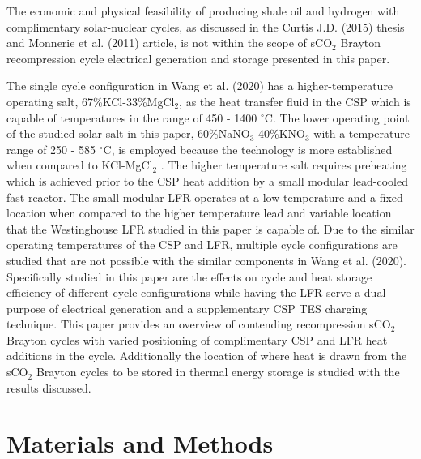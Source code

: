 The economic and physical feasibility of producing shale oil and hydrogen with complimentary solar-nuclear cycles, as discussed in the Curtis J.D. (2015) thesis and Monnerie et al. (2011) article, is not within the scope of sCO$_2$ Brayton recompression cycle electrical generation and storage presented in this paper.

The single cycle configuration in Wang et al. (2020) has a higher-temperature operating salt, 67\%KCl-33\%MgCl$_2$, as the heat transfer fluid in the CSP which is capable of temperatures in the range of 450 - 1400 $^{\circ}$C. The lower operating point of the studied solar salt in this paper, 60\%NaNO$_3$-40\%KNO$_3$ with a temperature range of 250 - 585 $^{\circ}$C, is employed because the technology is more established when compared to KCl-MgCl$_2$ \cite{turchi_2018}. The higher temperature salt requires preheating which is achieved prior to the CSP heat addition by a small modular lead-cooled fast reactor. The small modular LFR operates at a low temperature and a fixed location when compared to the higher temperature lead and variable location that the Westinghouse LFR studied in this paper is capable of. Due to the similar operating temperatures of the CSP and LFR, multiple cycle configurations are studied that are not possible with the similar components in Wang et al. (2020). Specifically studied in this paper are the effects on cycle and heat storage efficiency of different cycle configurations while having the LFR serve a dual purpose of electrical generation and a supplementary CSP TES charging technique. This paper provides an overview of contending recompression sCO$_2$ Brayton cycles with varied positioning of complimentary CSP and LFR heat additions in the cycle. Additionally the location of where heat is drawn from the sCO$_2$ Brayton cycles to be stored in thermal energy storage is studied with the results discussed.



 
\section{Materials and Methods}


